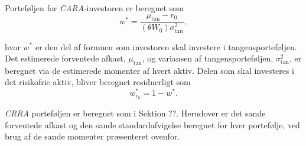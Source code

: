 \documentclass[
  a4paper,
  oneside]{memoir}
\begin{document}
Porteføljen for \emph{CARA}-investoren er beregnet som
\[w^*=\frac{\mu_{\text{tan}}-r_0}{(\theta W_0)\sigma_{\text{tan}}^2},\]

hvor \(w^*\) er den del af formuen som investoren skal investere i tangensporteføljen. Det estimerede forventede afkast, \(\mu_{\text{tan}}\), og variansen af tangensporteføljen, \(\sigma_{\text{tan}}^2\), er beregnet via de estimerede momenter af hvert aktiv. Delen som skal investeres i det risikofrie aktiv, bliver beregnet residuerligt som
\[w_{r_0}^*=1-w^*.\]

\emph{CRRA} porteføljen er beregnet som i Sektion ??. Herudover er det sande forventede afkast og den sande standardafvigelse beregnet for hver portefølje, ved brug af de sande momenter præsenteret ovenfor.

\begin{table}[!h]


\end{table}
\end{document}
